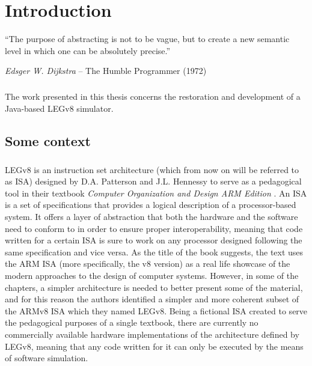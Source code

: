 \chapter{Introduction}

\epigraph{``The purpose of abstracting is not to be vague, but to create a new semantic level in which one can be absolutely precise.''}{\textit{Edsger W. Dijkstra} -- The Humble Programmer (1972)}

\paragraph{}
The work presented in this thesis concerns the restoration and development of a Java-based LEGv8 simulator.

\section*{Some context}
\paragraph{}
LEGv8 is an instruction set architecture (which from now on will be referred to as ISA) designed by D.A. Patterson and J.L. Hennessy to serve as a pedagogical tool in their textbook \emph{Computer Organization and Design
ARM Edition} \cite{patterson2016computer}.
An ISA is a set of specifications that provides a logical description of a processor-based system. It offers a layer of abstraction that both the hardware and the software need to conform to in order to ensure proper interoperability, meaning that code written for a certain ISA is sure to work on any processor designed following the same specification and vice versa.
As the title of the book suggests, the text uses the ARM ISA (more specifically, the v8 version) as a real life showcase of the modern approaches to the design of computer systems. However, in some of the chapters, a simpler architecture is needed to better present some of the material, and for this reason the authors identified a simpler and more coherent subset of the ARMv8 ISA which they named LEGv8. 
Being a fictional ISA created to serve the pedagogical purposes of a single textbook, there are currently no commercially available hardware implementations of the architecture defined by LEGv8, meaning that any code written for it can only be executed by the means of software simulation.

